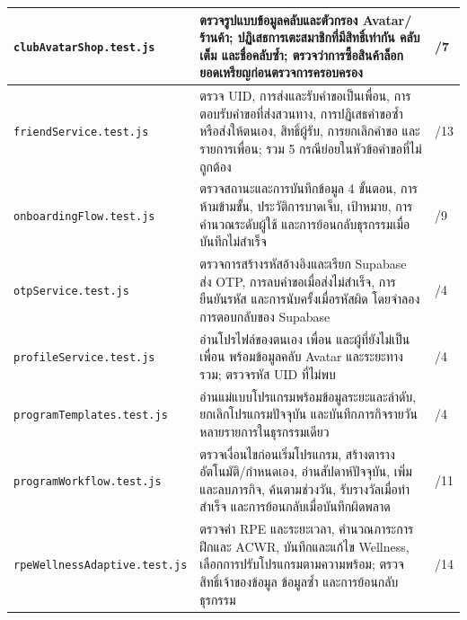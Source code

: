 \begin{longtable}{|>{\raggedright\arraybackslash}p{}|>{\raggedright\arraybackslash}p{}|>{\centering\arraybackslash}p{}|}
\texttt{clubAvatar}\newline\texttt{Shop.test.js} & ตรวจรูปแบบข้อมูลคลับและตัวกรอง Avatar/ร้านค้า; ปฏิเสธการเตะสมาชิกที่มีสิทธิ์เท่ากัน คลับเต็ม และชื่อคลับซ้ำ; ตรวจว่าการซื้อสินค้าล็อกยอดเหรียญก่อนตรวจการครอบครอง & 7/7 \\ \hline
\texttt{friend}\newline\texttt{Service}\newline\texttt{.test.js} & ตรวจ UID, การส่งและรับคำขอเป็นเพื่อน, การตอบรับคำขอที่ส่งสวนทาง, การปฏิเสธคำขอซ้ำหรือส่งให้ตนเอง, สิทธิ์ผู้รับ, การยกเลิกคำขอ และรายการเพื่อน; รวม 5 กรณีย่อยในหัวข้อคำขอที่ไม่ถูกต้อง & 13/13 \\ \hline
\texttt{onboarding}\newline\texttt{Flow.test.js} & ตรวจสถานะและการบันทึกข้อมูล 4 ขั้นตอน, การห้ามข้ามขั้น, ประวัติการบาดเจ็บ, เป้าหมาย, การคำนวณระดับผู้ใช้ และการย้อนกลับธุรกรรมเมื่อบันทึกไม่สำเร็จ & 9/9 \\ \hline
\texttt{otpService}\newline\texttt{.test.js} & ตรวจการสร้างรหัสอ้างอิงและเรียก Supabase ส่ง OTP, การลบคำขอเมื่อส่งไม่สำเร็จ, การยืนยันรหัส และการนับครั้งเมื่อรหัสผิด โดยจำลองการตอบกลับของ Supabase & 4/4 \\ \hline
\texttt{profile}\newline\texttt{Service}\newline\texttt{.test.js} & อ่านโปรไฟล์ของตนเอง เพื่อน และผู้ที่ยังไม่เป็นเพื่อน พร้อมข้อมูลคลับ Avatar และระยะทางรวม; ตรวจรหัส UID ที่ไม่พบ & 4/4 \\ \hline
\texttt{program}\newline\texttt{Templates}\newline\texttt{.test.js} & อ่านแม่แบบโปรแกรมพร้อมข้อมูลระยะและลำดับ, ยกเลิกโปรแกรมปัจจุบัน และบันทึกภารกิจรายวันหลายรายการในธุรกรรมเดียว & 4/4 \\ \hline
\texttt{program}\newline\texttt{Workflow}\newline\texttt{.test.js} & ตรวจเงื่อนไขก่อนเริ่มโปรแกรม, สร้างตารางอัตโนมัติ/กำหนดเอง, อ่านสัปดาห์ปัจจุบัน, เพิ่มและลบภารกิจ, ค้นตามช่วงวัน, รับรางวัลเมื่อทำสำเร็จ และการย้อนกลับเมื่อบันทึกผิดพลาด & 11/11 \\ \hline
\texttt{rpeWellness}\newline\texttt{Adaptive}\newline\texttt{.test.js} & ตรวจค่า RPE และระยะเวลา, คำนวณภาระการฝึกและ ACWR, บันทึกและแก้ไข Wellness, เลือกการปรับโปรแกรมตามความพร้อม; ตรวจสิทธิ์เจ้าของข้อมูล ข้อมูลซ้ำ และการย้อนกลับธุรกรรม & 14/14 \\ \hline

\end{longtable}
